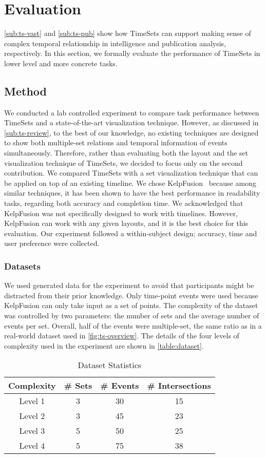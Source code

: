\section{Evaluation}
\autoref{sub:ts-vast} and \autoref{sub:ts-pub} show how TimeSets can support making sense of complex temporal relationship in intelligence and publication analysis, respectively. In this section, we formally evaluate the performance of TimeSets in lower level and more concrete tasks.

\subsection{Method}
We conducted a lab controlled experiment to compare task performance between TimeSets and a state-of-the-art visualization technique. However, as discussed in \autoref{sub:ts-review}, to the best of our knowledge, no existing techniques are designed to show both multiple-set relations and temporal information of events simultaneously. Therefore, rather than evaluating both the layout and the set visualization technique of TimeSets, we decided to focus only on the second contribution. We compared TimeSets with a set visualization technique that can be applied on top of an existing timeline. We chose KelpFusion~\cite{Meulemans2013} because among similar techniques, it has been shown to have the best performance in readability tasks, regarding both accuracy and completion time. We acknowledged that KelpFusion was not specifically designed to work with timelines. However, KelpFusion can work with any given layouts, and it is the best choice for this evaluation. Our experiment followed a within-subject design; accuracy, time and user preference were collected.

\subsubsection{Datasets}
We used generated data for the experiment to avoid that participants might be distracted from their prior knowledge. Only time-point events were used because KelpFusion can only take input as a set of points. The complexity of the dataset was controlled by two parameters: the number of sets and the average number of events per set. Overall, half of the events were multiple-set, the same ratio as in a real-world dataset used in \autoref{fig:ts-overview}. The details of the four levels of complexity used in the experiment are shown in \autoref{table:dataset}.

\begin{table}[!htb]
\centering
\sffamily\small
\caption{Dataset Statistics}
\label{table:dataset}
\begin{tabular}{cccc}
	\toprule
	\textbf{Complexity} & \textbf{\# Sets} & \textbf{\# Events} & \textbf{\# Intersections} \\
	\midrule
	Level 1 & 3 & 30 & 15 \\
	Level 2 & 3 & 45 & 23 \\
	Level 3 & 5 & 50 & 25 \\
	Level 4 & 5 & 75 & 38 \\
	\bottomrule
\end{tabular}
\end{table}

